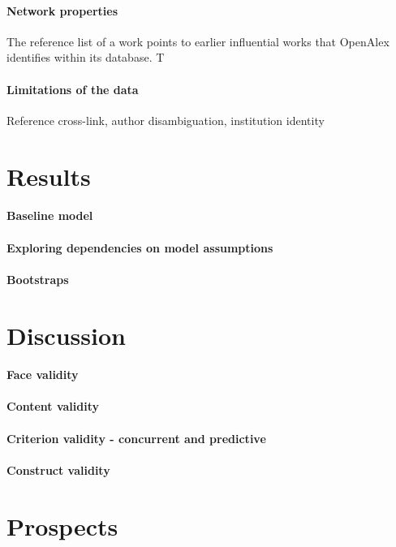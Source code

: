 \documentclass[10pt]{article}
\begin{document}
\paragraph{Network properties}
The reference list of a work points to earlier influential works that OpenAlex identifies within its database. T

\paragraph{Limitations of the data}
Reference cross-link, author disambiguation, institution identity

\section{Results}

\paragraph{Baseline model}

\paragraph{Exploring dependencies on model assumptions}

\paragraph{Bootstraps}

\section{Discussion}

\paragraph{Face validity}

\paragraph{Content validity}

\paragraph{Criterion validity - concurrent and predictive}

\paragraph{Construct validity}

\section{Prospects}



\end{document}
